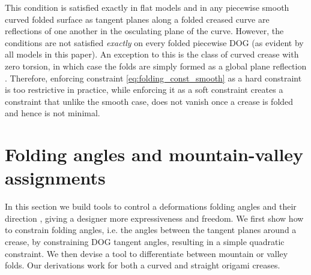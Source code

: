 This condition is satisfied exactly in flat models and in any piecewise smooth curved folded surface as tangent planes along a folded creased curve are reflections of one another in the osculating plane of the curve. However, the conditions are not satisfied \emph{exactly} on every folded piecewise DOG (as evident by all models in this paper). An exception to this is the class of curved crease with zero torsion, in which case the folds are simply formed as a global plane reflection \cite{Mitani_ref}. Therefore, enforcing constraint \eqref{eq:folding_const_smooth} as a hard constraint is too restrictive in practice, while enforcing it as a soft constraint creates a constraint that unlike the smooth case, does not vanish once a crease is folded and hence is not minimal.

\section{Folding angles and mountain-valley assignments} \label{sec:folding_angles_mountain_valley}
In this section we build tools to control a deformations folding angles and their direction , giving a designer more expressiveness and freedom. We first show how to constrain folding angles, i.e. the angles between the tangent planes around a crease, by constraining DOG tangent angles, resulting in a simple quadratic constraint. We then devise a tool to differentiate between mountain or valley folds. Our derivations work for both a curved and straight origami creases.

